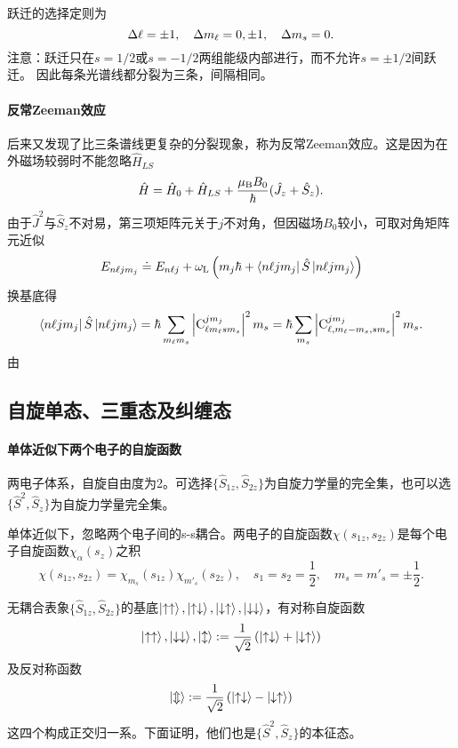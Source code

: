 跃迁的选择定则为
\[\Delta\ell=\pm 1,\quad \Delta m_\ell=0,\pm 1,\quad \Delta m_s=0.\]
注意：跃迁只在$s=1/2$或$s=-1/2$两组能级内部进行，而不允许$s=\pm 1/2$间跃迁。
因此每条光谱线都分裂为三条，间隔相同。
\paragraph*{反常Zeeman效应}后来又发现了比三条谱线更复杂的分裂现象，称为反常Zeeman效应。这是因为在外磁场较弱时不能忽略$\hat H_{LS}$
\[\hat H=\hat H_0+\hat H_{LS}+\frac{\mu_\mathrm B B_0}\hbar(\hat J_z+\hat S_z).\]
由于$\hat J^2$与$\hat S_z$不对易，第三项矩阵元关于$j$不对角，但因磁场$B_0$较小，可取对角矩阵元近似
\[E_{n\ell jm_j}\doteq E_{n\ell j}+\omega_\mathrm L\left(m_j\hbar+\left\langle n\ell jm_j\right\vert\hat S\left\vert n\ell jm_j\right\rangle\right)\]
换基底得
\[\left\langle n\ell jm_j\right\vert\hat S\left\vert n\ell jm_j\right\rangle=\hbar\sum_{m_\ell m_s}\left\lvert\operatorname{C}_{\ell m_\ell sm_s}^{jm_j}\right\rvert^2m_s=\hbar\sum_{m_s}\left\lvert\operatorname{C}_{\ell,m_\ell-m_s,sm_s}^{jm_j}\right\rvert^2m_s.\]
由
\subsection{自旋单态、三重态及纠缠态}
\paragraph*{单体近似下两个电子的自旋函数}
两电子体系，自旋自由度为2。可选择$\{\hat S_{1z},\hat S_{2z}\}$为自旋力学量的完全集，也可以选$\{\hat S^2,\hat S_z\}$为自旋力学量完全集。

单体近似下，忽略两个电子间的s-s耦合。两电子的自旋函数$\chi(s_{1z},s_{2z})$是每个电子自旋函数$\chi_\alpha(s_z)$之积
\[\chi(s_{1z},s_{2z})=\chi_{m_s}(s_{1z})\chi_{m'_s}(s_{2z}),\quad s_1=s_2=\frac12,\quad m_s=m'_s=\pm\frac12.\]

无耦合表象$\{\hat S_{1z},\hat S_{2z}\}$的基底$\left\vert \uparrow\uparrow\right\rangle,\left\vert \uparrow\downarrow\right\rangle,\left\vert \downarrow\uparrow\right\rangle,\left\vert \downarrow\downarrow\right\rangle$，有对称自旋函数
\[\left\vert \uparrow\uparrow\right\rangle,\left\vert \downarrow\downarrow\right\rangle,\left\vert \updownarrow\right\rangle:=\frac1{\sqrt2}\left(\left\vert \uparrow\downarrow\right\rangle+\left\vert \downarrow\uparrow\right\rangle\right)\]
及反对称函数
\[\left\vert \Updownarrow\right\rangle :=\frac1{\sqrt2}\left(\left\vert \uparrow\downarrow\right\rangle-\left\vert \downarrow\uparrow\right\rangle\right)\]
这四个构成正交归一系。下面证明，他们也是$\{\hat S^2,\hat S_z\}$的本征态。

